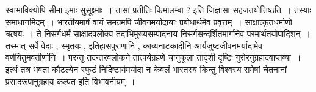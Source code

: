 {स्वाभाविक्योपि सीमा इमाः सुसूक्ष्माः~। तासां प्रतीतिः किमालम्बा ?  इति जिज्ञासा सहजतयोत्तिष्ठति~। तस्याः समाधानमिदम्~। भारतीयमार्षं वायं समग्रमपि जीवनमर्यादायाः प्रबोधार्थमेव प्रवृत्तम्~। साक्षात्कृतधर्माणो ऋषयः~। ते निसर्गधर्मं साक्षादवलोक्य तदाभिमुख्यसम्पादनाय निसर्गसन्दर्शितमार्गानेव परमार्थतयोपादिशन्~। तस्मात् सर्वे वेदाः , स्मृतयः , इतिहासपुराणानि , काव्यनाटकादीनि आर्यजुष्टजीवनमर्यादामेव वर्णयितुमवतीर्णानि~। परन्तु तदन्तरवलोकने तात्पर्यग्रहणे चानुकूला तादृशी दृष्टिः गुरोरनुग्रहादवाप्तव्या~। इत्थं तत्र भवता कौटल्येन स्फुटं निर्दिष्टार्यमर्यादा न केवलं भारतस्य किन्तु विश्वस्य समेषां चेतनानां प्रसादरूपानुग्रहाय कल्पत इति विभावनीयम्~। 

\articleend
}
